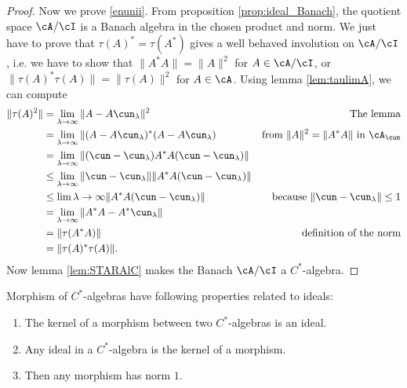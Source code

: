 \begin{proof}
Now we prove \ref{enunii}.
From proposition \ref{prop:ideal_Banach}, the quotient space $\cA/\cI$ is a Banach algebra in the chosen product and  norm. We just have to prove that $\tau(A)^*=\tau(A^*)$ gives a well behaved involution on $\cA/\cI$, i.e. we have to show that $\| A^*A \|=\| A \|^2$ for $A\in\cA/\cI$, or $\| \tau(A)^*\tau(A) \|=\| \tau(A) \|^2$ for $A\in\cA$. Using lemma \ref{lem:taulimA}, we can compute
\begin{equation}
\begin{aligned}
\| \tau(A)^2 \|&=\lim_{\lambda\to\infty}\| A-A\cun_{\lambda} \|^2&\textrm{The lemma}\\
               &=\lim_{\lambda\to\infty}\| (A-A\cun_{\lambda})^*(A-A\cun_{\lambda})&\textrm{from $\| A \|^2=\| A^*A \|$
in $\cA_{\cun}$} \\
               &=\lim_{\lambda\to\infty}\| (\cun-\cun_{\lambda})A^*A(\cun-\cun_{\lambda}) \|\\
               &\leq\lim_{\lambda\to\infty}\| \cun-\cun_{\lambda} \|\| A^*A(\cun-\cun_{\lambda}) \|\\
               &\leq\lim{\lambda\to\infty}\| A^*A(\cun-\cun_{\lambda}) \|&\textrm{because $\| \cun-\cun_{\lambda} \|\leq 1$}\\
               &=\lim_{\lambda\to\infty}\| A^*A-A^*\cun_{\lambda} \|\\
               &=\| \tau(A^*A) \|&\textrm{definition of the norm}\\
               &=\| \tau(A)^*\tau(A) \|.
\end{aligned}
\end{equation}
Now lemma \ref{lem:STARAlC} makes the Banach $\cA/\cI$ a $C^*$-algebra.

\end{proof}

\begin{corollary}
Morphism of $C^*$-algebras have following properties related to ideals:

\begin{enumerate}
\item The kernel of a morphism between two $C^*$-algebras is an ideal.  \label{enupi}
\item Any ideal in a $C^*$-algebra is the kernel of a morphism.\label{enupii}
\item Then any morphism has norm $1$.\label{enupiii}
\end{enumerate}

\end{corollary}

